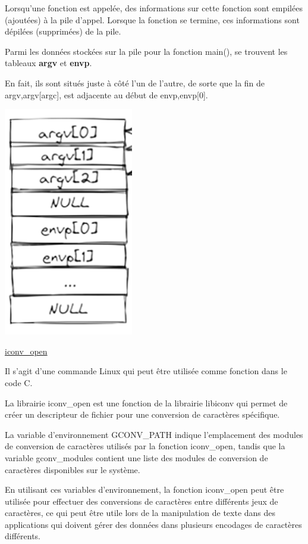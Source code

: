 \documentclass[12pt,a4paper]{article}
\begin{document}
\begin{flushleft}
                 \item Lorsqu'une fonction est appelée, des informations sur cette fonction sont empilées (ajoutées) à la pile d'appel. Lorsque la fonction se termine, ces informations sont dépilées (supprimées) de la pile.
                \item Parmi les données stockées sur la pile pour la fonction main(), se trouvent les tableaux \textbf{argv} et \textbf{envp}.
                \item En fait, ils sont situés juste à côté l’un de l’autre, de sorte que la fin de argv,argv[argc], est adjacente au début de envp,envp[0].
                \begin{center}
                    \includegraphics[scale=0.4]{pile_appel}
                \end{center}
                \newpage
            \item \underline{iconv\_open }
                \item Il s’agit d’une commande Linux qui peut être utilisée comme fonction dans le code C. 
                \item La librairie iconv\_open est une fonction de la librairie libiconv qui permet de créer un descripteur de fichier pour une conversion de caractères spécifique. 
                \item La variable d'environnement GCONV\_PATH indique l'emplacement des modules de conversion de caractères utilisés par la fonction iconv\_open, tandis que la variable gconv\_modules contient une liste des modules de conversion de caractères disponibles sur le système.
                \item En utilisant ces variables d'environnement, la fonction iconv\_open peut être utilisée pour effectuer des conversions de caractères entre différents jeux de caractères, ce qui peut être utile lors de la manipulation de texte dans des applications qui doivent gérer des données dans plusieurs encodages de caractères différents.

\end{flushleft}
\end{document}
